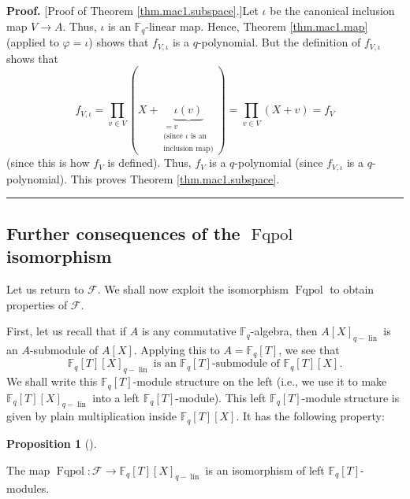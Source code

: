 \documentclass[numbers=enddot,12pt,final,onecolumn,notitlepage]{scrartcl}%
\theoremstyle{definition}
\newtheorem{prop}[theo]{Proposition}
\newenvironment{proposition}[1][]
{\begin{prop}[#1]\begin{leftbar}}
{\end{leftbar}\end{prop}}
\newenvironment{proof}[1][Proof]{\noindent\textbf{#1.} }{\ \rule{0.5em}{0.5em}}
\let\prodnonlimits\prod
\renewcommand{\prod}{\prodnonlimits\limits}
\begin{document}
\begin{proof}
[Proof of Theorem \ref{thm.mac1.subspace}.]Let $\iota$ be the canonical
inclusion map $V\rightarrow A$. Thus, $\iota$ is an $\mathbb{F}_{q}$-linear
map. Hence, Theorem \ref{thm.mac1.map} (applied to $\varphi=\iota$) shows that
$f_{V,\iota}$ is a $q$-polynomial. But the definition of $f_{V,\iota}$ shows
that%
\[
f_{V,\iota}=\prod_{v\in V}\left(  X+\underbrace{\iota\left(  v\right)
}_{\substack{=v\\\text{(since }\iota\text{ is an}\\\text{inclusion map)}%
}}\right)  =\prod_{v\in V}\left(  X+v\right)  =f_{V}%
\]
(since this is how $f_{V}$ is defined). Thus, $f_{V}$ is a $q$-polynomial
(since $f_{V,\iota}$ is a $q$-polynomial). This proves Theorem
\ref{thm.mac1.subspace}.
\end{proof}

\subsection{Further consequences of the $\operatorname*{Fqpol}$ isomorphism}

Let us return to $\mathcal{F}$. We shall now exploit the isomorphism
$\operatorname*{Fqpol}$ to obtain properties of $\mathcal{F}$.

First, let us recall that if $A$ is any commutative $\mathbb{F}_{q}$-algebra,
then $A\left[  X\right]  _{q-\operatorname*{lin}}$ is an $A$-submodule of
$A\left[  X\right]  $. Applying this to $A=\mathbb{F}_{q}\left[  T\right]  $,
we see that
\begin{equation}
\mathbb{F}_{q}\left[  T\right]  \left[  X\right]  _{q-\operatorname*{lin}%
}\text{ is an }\mathbb{F}_{q}\left[  T\right]  \text{-submodule of }%
\mathbb{F}_{q}\left[  T\right]  \left[  X\right]  \text{.}
\label{eq.q-pol.q-lin.leftT}%
\end{equation}
We shall write this $\mathbb{F}_{q}\left[  T\right]  $-module structure on the
left (i.e., we use it to make $\mathbb{F}_{q}\left[  T\right]  \left[
X\right]  _{q-\operatorname*{lin}}$ into a left $\mathbb{F}_{q}\left[
T\right]  $-module). This left $\mathbb{F}_{q}\left[  T\right]  $-module
structure is given by plain multiplication inside $\mathbb{F}_{q}\left[
T\right]  \left[  X\right]  $. It has the following property:

\begin{proposition}
\label{prop.q-pol.Fqlin.leftT}The map $\operatorname*{Fqpol}:\mathcal{F}%
\rightarrow\mathbb{F}_{q}\left[  T\right]  \left[  X\right]
_{q-\operatorname*{lin}}$ is an isomorphism of left $\mathbb{F}_{q}\left[
T\right]  $-modules.
\end{proposition}
\end{document}
